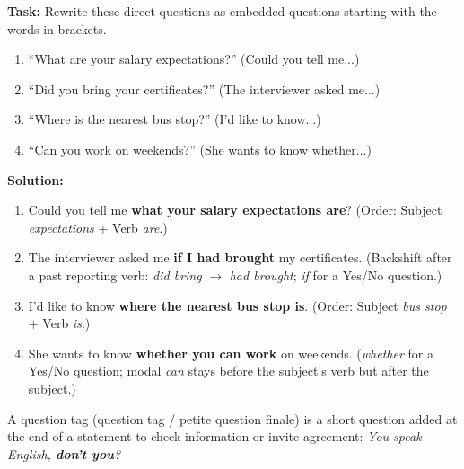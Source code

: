 \documentclass[11pt]{article}
\newcommand{\cle}[1]{{\popxbold\color{popdark}#1}}
\newcounter{popsec}
\newcounter{popsub}
\newcommand{\courssub}[1]{%
  \stepcounter{popsub}%
  \par\vspace{9pt}\noindent{\popxbold\fontsize{11.5}{13}\selectfont\color{popink}{\color{poporange}\thepopsec.\thepopsub}\hspace{6pt}#1}\par\nopagebreak\vspace{4pt}
}
\begin{document}
\begin{exoresolu}
\textbf{Task:} Rewrite these direct questions as embedded questions starting with the words in brackets.
\begin{enumerate}
    \item ``What are your salary expectations?'' (Could you tell me...)
    \item ``Did you bring your certificates?'' (The interviewer asked me...)
    \item ``Where is the nearest bus stop?'' (I'd like to know...)
    \item ``Can you work on weekends?'' (She wants to know whether...)
\end{enumerate}

\tcblower
\textbf{Solution:}
\begin{enumerate}
    \item Could you tell me \textbf{what your salary expectations are}? (Order: Subject \emph{expectations} + Verb \emph{are}.)
    \item The interviewer asked me \textbf{if I had brought} my certificates. (Backshift after a past reporting verb: \emph{did bring} $\rightarrow$ \emph{had brought}; \emph{if} for a Yes/No question.)
    \item I'd like to know \textbf{where the nearest bus stop is}. (Order: Subject \emph{bus stop} + Verb \emph{is}.)
    \item She wants to know \textbf{whether you can work} on weekends. (\emph{whether} for a Yes/No question; modal \emph{can} stays before the subject's verb but after the subject.)
\end{enumerate}
\end{exoresolu}

\courssub{Question Tags}

\begin{definition}
A \cle{question tag} (question tag / petite question finale) is a short question added at the end of a statement to check information or invite agreement: \emph{You speak English, \textbf{don't you}?}
\end{definition}
\end{document}
